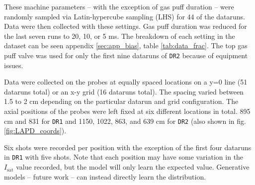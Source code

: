 These machine parameters -- with the exception of gas puff duration -- were randomly sampled via Latin-hypercube sampling (LHS) for 44 of the dataruns. Data were then collected with these settings. Gas puff duration was reduced for the last seven runs to 20, 10, or 5 ms. The breakdown of each setting in the dataset can be seen appendix \ref{sec:app_bias}, table \ref{tab:data_frac}. The top gas puff valve was used for only the first nine dataruns of \texttt{DR2} because of equipment issues.

Data were collected on the probes at equally spaced locations on a y=0 line (51 dataruns total) or an x-y grid (16 dataruns total). The spacing varied between 1.5 to 2 cm depending on the particular datarun and grid configuration. The axial positions of the probes were left fixed at six different locations in total. 895 cm and 831 for \texttt{DR1} and 1150, 1022, 863, and 639 cm for \texttt{DR2} (also shown in fig. \ref{fig:LAPD_coords}). 

Six shots were recorded per position with the exception of the first four dataruns in \texttt{DR1} with five shots. Note that each position may have some variation in the $I_\text{sat}$ value recorded, but the model will only learn the expected value. Generative models -- future work -- can instead directly learn the distribution.


%

